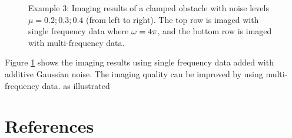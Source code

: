 \documentclass[12pt]{iopart}
\begin{document}
\begin{figure}
	\caption{Example 3: Imaging results of a clamped obstacle with noise levels $\mu =  0.2; 0.3; 0.4$ (from left to
		right). The top row is imaged with single frequency data where $\omega=4\pi$, and the
		bottom row is imaged with multi-frequency data.}\label{figure_3}
\end{figure}

Figure \ref{figure_3} shows the imaging results using single frequency data added with additive
Gaussian noise. The imaging quality can be improved by using multi-frequency data.
as illustrated 
\section*{References}

\end{document}
